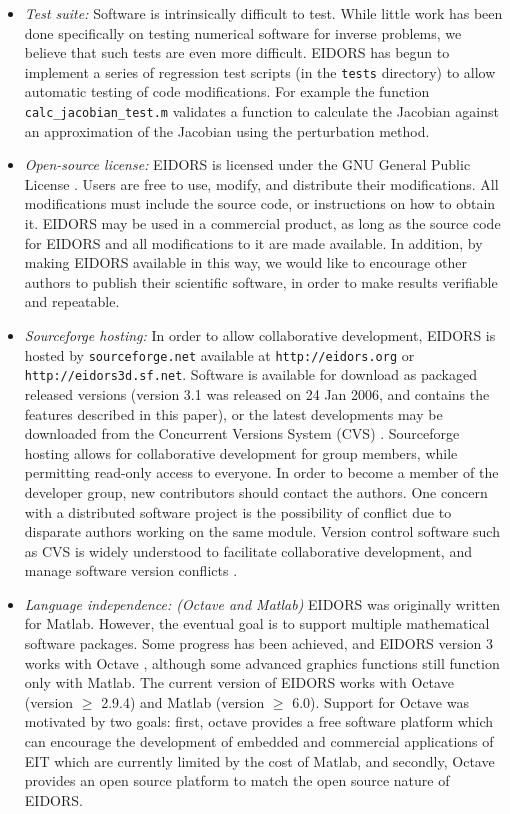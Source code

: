 \documentclass[12pt]{iopart}
\begin{document}
\begin{itemize}
  \item {\em Test suite:}
Software is intrinsically difficult to test. While little work
has been done specifically on testing numerical software
for inverse problems, we
believe that such tests are even more difficult.
EIDORS has begun to implement a series of regression test
scripts (in the {\tt tests} directory)
to allow automatic testing of code modifications.
For example the function {\tt calc\_jacobian\_test.m}
validates a function to calculate the Jacobian against
an approximation of the Jacobian using the perturbation method. 

  \item {\em Open-source license:}
EIDORS is licensed under the
GNU General Public License \cite{Free_Software_Foundation_1991}.
Users are free to use, modify, and
distribute their modifications. All modifications must include the
source code, or instructions on how to obtain it. EIDORS may be used
in a commercial product, as long as the source code for EIDORS and all
modifications to it are made available.
In addition, by making EIDORS available in this way,
we would like to encourage other authors to publish
their scientific software, in order to make results
verifiable and repeatable.

  \item {\em Sourceforge hosting:}
In order to allow collaborative development, 
EIDORS is hosted by {\tt sourceforge.net}
available at {\tt http://eidors.org} or {\tt http://eidors3d.sf.net}.
Software is available for download as packaged released versions
(version 3.1 was released on 24 Jan 2006, and
contains the features described in this paper),
or the latest developments may be downloaded from the
Concurrent Versions System (CVS) \cite{Cederqvist_2002}.
Sourceforge hosting allows for collaborative development for
group members, while permitting read-only access to everyone.
In order to become a member of the developer group, new
contributors should contact the authors.
One concern with a distributed software project is
the possibility of conflict due to disparate authors
working on the same module.
Version control software such as CVS is widely understood
to facilitate collaborative development, and manage
software version conflicts \cite{Cederqvist_2002}.


  \item {\em Language independence: (Octave and Matlab)}
EIDORS was originally written for Matlab.
However, the eventual goal is to support multiple
mathematical software packages.
Some progress has been achieved, and EIDORS version 3
works with Octave \cite{Eaton_2002}, although some 
advanced graphics functions still function only with Matlab.
The current version of EIDORS works with Octave
(version $\ge$ 2.9.4)
and Matlab (version $\ge$ 6.0).
Support for Octave was motivated by two goals:
first, octave provides a free software platform
which can encourage the development of embedded
and commercial applications of EIT which are
currently
limited by the cost of Matlab, and secondly,
Octave provides an open source platform to match
the open source nature of EIDORS.


\end{itemize}
\end{document}
